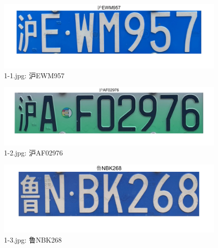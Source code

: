 \documentclass[utf8,a4paper]{ctexart}
\begin{document}
\begin{appendices}
    \begin{minipage}{0.44\linewidth}
        \begin{figure}[H]
            \center
            \includegraphics[width=\linewidth]{../result/easy/1-1.png}
            \caption{1-1.jpg: 沪EWM957}
        \end{figure}
    \end{minipage}
    \hfill
    \begin{minipage}{0.44\linewidth}
        \begin{figure}[H]
            \center
            \includegraphics[width=\linewidth]{../result/easy/1-2.png}
            \caption{1-2.jpg: 沪AF02976}
        \end{figure}
    \end{minipage}
    \par
    \begin{minipage}{0.44\linewidth}
        \begin{figure}[H]
            \center
            \includegraphics[width=\linewidth]{../result/easy/1-3.png}
            \caption{1-3.jpg: 鲁NBK268} 
        \end{figure}
    \end{minipage}
    \hfill
    \begin{minipage}{0.44\linewidth}
        

\end{minipage}
\end{appendices}
\end{document}
